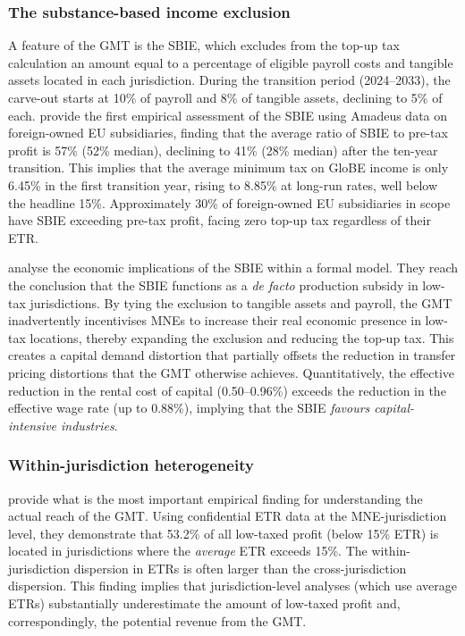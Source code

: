 \documentclass[11pt,a4paper]{article}
\begin{document}
\subsubsection{The substance-based income exclusion}

A feature of the GMT is the SBIE, which excludes from the top-up tax calculation an amount equal to a percentage of eligible payroll costs and tangible assets located in each jurisdiction. During the transition period (2024--2033), the carve-out starts at 10\% of payroll and 8\% of tangible assets, declining to 5\% of each. \citet{devereux2023} provide the first empirical assessment of the SBIE using Amadeus data on foreign-owned EU subsidiaries, finding that the average ratio of SBIE to pre-tax profit is 57\% (52\% median), declining to 41\% (28\% median) after the ten-year transition. This implies that the average minimum tax on GloBE income is only 6.45\% in the first transition year, rising to 8.85\% at long-run rates, well below the headline 15\%. Approximately 30\% of foreign-owned EU subsidiaries in scope have SBIE exceeding pre-tax profit, facing zero top-up tax regardless of their ETR.

\citet{schjelderup2024} analyse the economic implications of the SBIE within a formal model. They reach the conclusion that the SBIE functions as a \emph{de facto} production subsidy in low-tax jurisdictions. By tying the exclusion to tangible assets and payroll, the GMT inadvertently incentivises MNEs to increase their real economic presence in low-tax locations, thereby expanding the exclusion and reducing the top-up tax. This creates a capital demand distortion that partially offsets the reduction in transfer pricing distortions that the GMT otherwise achieves. Quantitatively, the effective reduction in the rental cost of capital (0.50--0.96\%) exceeds the reduction in the effective wage rate (up to 0.88\%), implying that the SBIE \emph{favours capital-intensive industries}.

\subsubsection{Within-jurisdiction heterogeneity}

\citet{hugger2026} provide what is the most important empirical finding for understanding the actual reach of the GMT. Using confidential ETR data at the MNE-jurisdiction level, they demonstrate that 53.2\% of all low-taxed profit (below 15\% ETR) is located in jurisdictions where the \textit{average} ETR exceeds 15\%. The within-jurisdiction dispersion in ETRs is often larger than the cross-jurisdiction dispersion. This finding implies that jurisdiction-level analyses (which use average ETRs) substantially underestimate the amount of low-taxed profit and, correspondingly, the potential revenue from the GMT.
\end{document}

